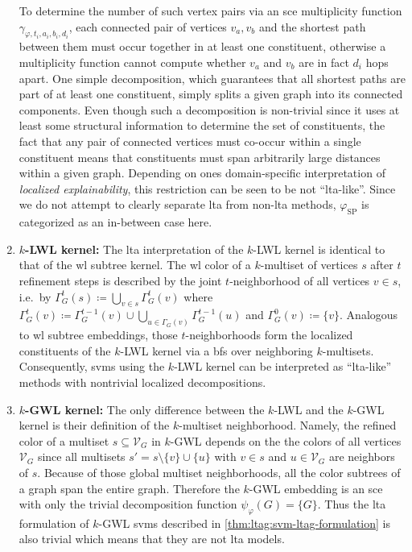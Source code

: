 \begin{enumerate}[label=\textbf{\arabic*.},ref={\arabic*}]
		To determine the number of such vertex pairs via an \ac{sce} multiplicity function $\gamma_{\varphi, t_i, a_i, b_i, d_i}$, each connected pair of vertices $v_a, v_b$ and the shortest path between them must occur together in at least one constituent, otherwise a multiplicity function cannot compute whether $v_a$ and $v_b$ are in fact $d_i$ hops apart.
		One simple decomposition, which guarantees that all shortest paths are part of at least one constituent, simply splits a given graph into its connected components.
		Even though such a decomposition is non-trivial since it uses at least some structural information to determine the set of constituents, the fact that any pair of connected vertices must co-occur within a single constituent means that constituents must span arbitrarily large distances within a given graph.
		Depending on ones domain-specific interpretation of \textit{localized explainability}, this restriction can be seen to be not ``\acs{lta}-like''.
		Since we do not attempt to clearly separate \ac{lta} from non-\acs{lta} methods, $\varphi_{\mathrm{SP}}$ is categorized as an in-between case here.
	\item \textbf{$k$-LWL kernel:}\label{itm:ltag:klwl-lta-formulation}
		The \ac{lta} interpretation of the $k$-LWL kernel is identical to that of the \ac{wl} subtree kernel.
		The \ac{wl} color of a $k$-multiset of vertices $s$ after $t$ refinement steps is described by the joint $t$-neighborhood of all vertices $v \in s$, i.e.\ by $\Gamma_{G}^t(s) \coloneqq \bigcup_{v \in s} \Gamma_{G}^t(v)$ where $\Gamma_{G}^t(v) \coloneqq \Gamma_{G}^{t-1}(v) \cup \bigcup_{u \in \Gamma_{G}(v)} \Gamma_{G}^{t-1}(u)$ and $\Gamma_{G}^0(v) \coloneqq \{ v \}$.
		Analogous to \ac{wl} subtree embeddings, those $t$-neighborhoods form the localized constituents of the $k$-LWL kernel via a \ac{bfs} over neighboring $k$-multisets.
		Consequently, \acp{svm} using the $k$-LWL kernel can be interpreted as ``\acs{lta}-like'' methods with nontrivial localized decompositions.
	\item \textbf{$k$-GWL kernel:}\label{itm:ltag:kgwl-lta-formulation}
		The only difference between the $k$-LWL and the $k$-GWL kernel is their definition of the $k$-multiset neighborhood.
		Namely, the refined color of a multiset $s \subseteq \mathcal{V}_G$ in $k$-GWL depends on the the colors of all vertices $\mathcal{V}_G$ since all multisets $s' = s \setminus \{ v \} \cup \{ u \}$ with $v \in s$ and $u \in \mathcal{V}_G$ are neighbors of $s$.
		Because of those global multiset neighborhoods, all the color subtrees of a graph span the entire graph.
		Therefore the $k$-GWL embedding is an \ac{sce} with only the trivial decomposition function $\psi_{\varphi}(G) = \{ G \}$.
		Thus the \ac{lta} formulation of $k$-GWL \acp{svm} described in \cref{thm:ltag:svm-ltag-formulation} is also trivial which means that they are not \ac{lta} models.
\end{enumerate}

